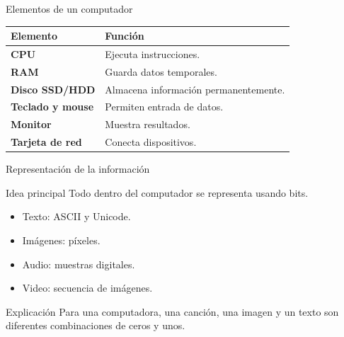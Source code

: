 \documentclass[10pt, aspectratio=169]{beamer}
\begin{document}
	\begin{frame}{Elementos de un computador}
		
		\small
		
		\begin{center}
			
			\begin{tabular}{>{\bfseries}p{3cm} p{8cm}}
				
				\toprule
				Elemento & Función \\
				\midrule
				CPU & Ejecuta instrucciones. \\
				RAM & Guarda datos temporales. \\
				Disco SSD/HDD & Almacena información permanentemente. \\
				Teclado y mouse & Permiten entrada de datos. \\
				Monitor & Muestra resultados. \\
				Tarjeta de red & Conecta dispositivos. \\
				\bottomrule
				
			\end{tabular}
			
		\end{center}
		
	\end{frame}
	
	\begin{frame}{Representación de la información}
		
		\begin{block}{Idea principal}
			Todo dentro del computador se representa usando bits.
		\end{block}
		
		\begin{itemize}
			\item Texto: ASCII y Unicode.
			\item Imágenes: píxeles.
			\item Audio: muestras digitales.
			\item Video: secuencia de imágenes.
		\end{itemize}
		
		\vspace{0.3cm}
		
		\begin{block}{Explicación}
			Para una computadora, una canción, una imagen y un texto son diferentes combinaciones de ceros y unos.
		\end{block}
		
	\end{frame}
	
\end{document}
